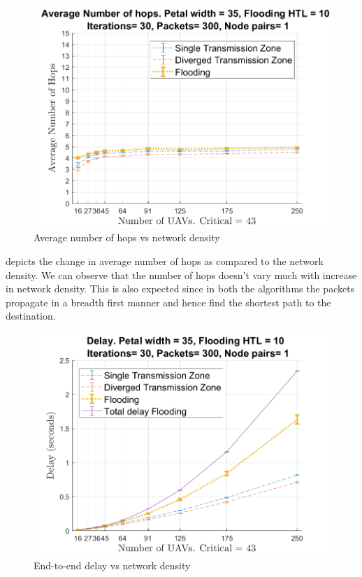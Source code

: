 \begin{figure}[hbtp]
\centering
\includegraphics[width=\simResultFigSize\textwidth]{ncsuthesis-0.6/Chapter-5/figs/ND_hops}
\caption{Average number of hops vs network density}
\label{fig:ND_hops}
\end{figure}

 depicts the change in average number of hops as compared to the network density. We can observe that the number of hops doesn't vary much with increase in network density. This is also expected since in both the algorithms the packets propagate in a breadth first manner and hence find the shortest path to the destination. 

\begin{figure}[hbtp]
\centering
\includegraphics[width=\simResultFigSize\textwidth]{ncsuthesis-0.6/Chapter-5/figs/ND_delay}
\caption{End-to-end delay vs network density}
\label{fig:ND_delay}
\end{figure}

